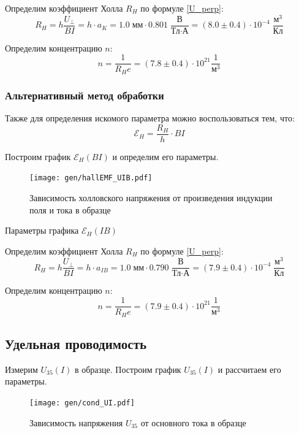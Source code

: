 \documentclass[12pt,a4paper]{article}
\begin{document}
	Определим коэффициент Холла $R_H$ по формуле \eqref{U_perp}:
	$$ R_H = h \frac{U_\perp}{BI} = h \cdot a_K = 1.0 \; \text{мм} \cdot 0.801 \; \frac{\text{В}}{\text{Тл} \cdot \text{А}} = (8.0 \pm 0.4) \cdot 10^{-4} \; \frac{\text{м}^3}{\text{Кл}} $$
	
	Определим концентрацию $n$:
	$$ n = \frac{1}{R_H e} = (7.8 \pm 0.4) \cdot 10^{21} \frac{1}{\text{м}^3} $$
	
	\subsubsection*{Альтернативный метод обработки}
	
	Также для определения искомого параметра можно воспользоваться тем, что:
	$$ \mathcal{E}_H = \frac{R_H}{h} \cdot BI $$
	
	Построим график $\mathcal{E}_H (BI)$ и определим его параметры.
	
	\begin{figure}[H]
		\texttt{[image: gen/hallEMF\_UIB.pdf]}
		\caption{Зависимость холловского напряжения от произведения индукции поля и тока в образце}
	\end{figure}
	
	\begin{table}[h]
		\caption{Параметры графика $\mathcal{E}_H (IB)$}
		
	\end{table}

	Определим коэффициент Холла $R_H$ по формуле \eqref{U_perp}:
	$$ R_H = h \frac{U_\perp}{BI} = h \cdot a_{IB} = 1.0 \; \text{мм} \cdot 0.790 \; \frac{\text{В}}{\text{Тл} \cdot \text{А}} = (7.9 \pm 0.4) \cdot 10^{-4} \; \frac{\text{м}^3}{\text{Кл}} $$
	
	Определим концентрацию $n$:
	$$ n = \frac{1}{R_H e} = (7.9 \pm 0.4) \cdot 10^{21} \frac{1}{\text{м}^3} $$
	
	\subsection*{Удельная проводимость}
	
	Измерим $U_{35} (I)$ в образце. Построим график $U_{35} (I)$ и рассчитаем его параметры.
	
	
	\begin{figure}[H]
		\texttt{[image: gen/cond\_UI.pdf]}
		\caption{Зависимость напряжения $U_{35}$ от основного тока в образце}
	\end{figure}
	
\end{document}
